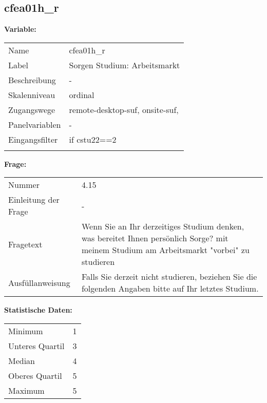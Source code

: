	
	
	\subsection{cfea01h\_r}
	\label{subSection:cfea01h_r}

	\noindent\textbf{Variable:}\\
		\begin{tabular}{lL{11.3cm}}
			\label{tableVariable:cfea01h_r}
			Name & cfea01h\_r \\
			Label & Sorgen Studium: Arbeitsmarkt \\
			Beschreibung & - \\
			Skalenniveau & ordinal \\
			Zugangswege &
				remote-desktop-suf,
				onsite-suf,
 \\
			Panelvariablen & -
			 \\
			Eingangsfilter & if cstu22==2 \\
 \\
		\end{tabular}

		\vspace*{1 cm}
		\noindent\textbf{Frage:}\\
		\begin{tabular}{lL{11.3cm}}
			\label{tableQuestion:cfea01h_r}
			Nummer & 4.15 \\
			Einleitung der Frage & - \\
			Fragetext & Wenn Sie an Ihr derzeitiges Studium denken, was bereitet Ihnen persönlich Sorge?
mit meinem Studium am Arbeitsmarkt "vorbei" zu studieren \\
			Ausfüllanweisung & Falls Sie derzeit nicht studieren, beziehen Sie die folgenden Angaben bitte auf Ihr letztes Studium. \\
		\end{tabular}


		\vspace*{1 cm}
		\noindent\textbf{Statistische Daten:}\\
			\begin{tabular}{ll}
				\label{tableStatistics:cfea01h_r}
					Minimum & 1 \\
					Unteres Quartil & 3 \\
					Median & 4 \\
					Oberes Quartil & 5 \\
					Maximum & 5 \\
			\end{tabular}



